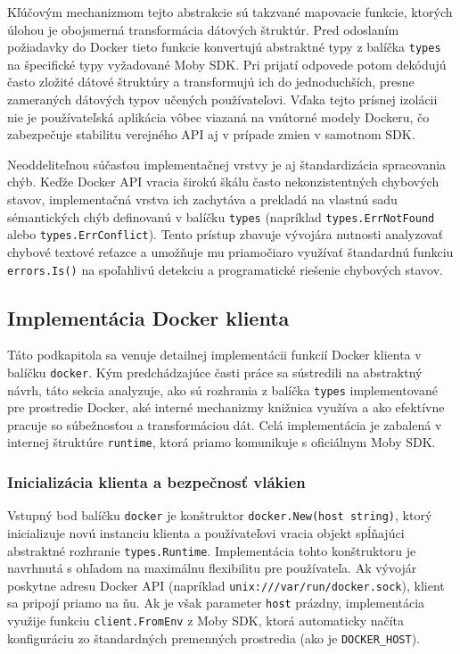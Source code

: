 \documentclass[
 program=infpvs,
  language=slovak,
  figures=false,
  tables=false,
  sourcecodes,
  glossaries,
  index
]{kidiplom}
\begin{document}
{Kľúčovým mechanizmom tejto abstrakcie sú takzvané mapovacie funkcie, ktorých úlohou je obojsmerná transformácia dátových štruktúr. Pred odoslaním požiadavky do Docker tieto funkcie konvertujú abstraktné typy z balíčka \texttt{types} na špecifické typy vyžadované Moby SDK. Pri prijatí odpovede potom dekódujú často zložité dátové štruktúry a transformujú ich do jednoduchších, presne zameraných dátových typov učených používateľovi. Vďaka tejto prísnej izolácii nie je používateľská aplikácia vôbec viazaná na vnútorné modely Dockeru, čo zabezpečuje stabilitu verejného API aj v prípade zmien v samotnom SDK.

Neoddeliteľnou súčasťou implementačnej vrstvy je aj štandardizácia spracovania chýb. Keďže Docker API vracia širokú škálu často nekonzistentných chybových stavov, implementačná vrstva ich zachytáva a prekladá na vlastnú sadu sémantických chýb definovanú v balíčku \texttt{types} (napríklad \texttt{types.ErrNotFound} alebo \texttt{types.ErrConflict}). Tento prístup zbavuje vývojára nutnosti analyzovať chybové textové reťazce a umožňuje mu priamočiaro využívať štandardnú funkciu \texttt{errors.Is()} na spoľahlivú detekciu a programatické riešenie chybových stavov.



\subsection{Implementácia Docker klienta}  \label{sec:implementacia-docker}
Táto podkapitola sa venuje detailnej implementácii funkcií Docker klienta v balíčku \texttt{docker}. Kým predchádzajúce časti práce sa sústredili na abstraktný návrh, táto sekcia analyzuje, ako sú rozhrania z balíčka \texttt{types} implementované pre prostredie Docker, aké interné mechanizmy knižnica využíva a ako efektívne pracuje so súbežnosťou a transformáciou dát. Celá implementácia je zabalená v internej štruktúre \texttt{runtime}, ktorá priamo komunikuje s oficiálnym Moby SDK.



\subsubsection{Inicializácia klienta a bezpečnosť vlákien}  \label{sec:inicializacia}
Vstupný bod balíčku \texttt{docker} je konštruktor \texttt{docker.New(host string)}, ktorý inicializuje novú instanciu klienta a používateľovi vracia objekt spĺňajúci abstraktné rozhranie \texttt{types.Runtime}. Implementácia tohto konštruktoru je navrhnutá s ohľadom na maximálnu flexibilitu pre používateľa. Ak vývojár poskytne adresu Docker API (napríklad \texttt{unix:///var/run/docker.sock}), klient sa pripojí priamo na ňu. Ak je však parameter \texttt{host} prázdny, implementácia využije funkciu \texttt{client.FromEnv} z Moby SDK, ktorá automaticky načíta konfiguráciu zo štandardných premenných prostredia (ako je \texttt{DOCKER\_HOST}).

}
\end{document}
